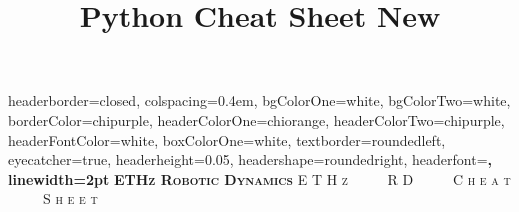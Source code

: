 \documentclass[landscape,a0paper,fontscale=0.285]{baposter} %
\title{Python Cheat Sheet New}
\begin{document}
\begin{poster}
{
headerborder=closed, %
colspacing=0.4em, %
bgColorOne=white, %
bgColorTwo=white, %
borderColor=chipurple, %
headerColorOne=chiorange, %
headerColorTwo=chipurple, %
headerFontColor=white, %
boxColorOne=white, %
textborder=roundedleft, %
eyecatcher=true, %
headerheight=0.05\textheight, %
headershape=roundedright, %
headerfont=\Large\bf\textsc, %
linewidth=2pt %
}
{\bf\textsc{ETHz Robotic Dynamics}\vspace{0.5em}} %
{\textsc{ E T H z \ \ \ \ \  R D  \ \ \ \ \ C h e a t \ \ \ \ \ S h e e t \hspace{12pt}}}



\end{poster}
\end{document}

